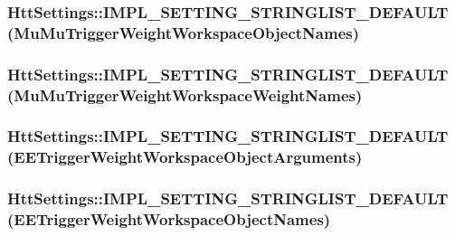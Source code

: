 \label{classHttSettings_a4ed979f31a66000c717db31d40241bae}
\hypertarget{classHttSettings_aed2ac5e09cc936ae32ab26abb998b025}{
\subsubsection[{IMPL\_\-SETTING\_\-STRINGLIST\_\-DEFAULT}]{\setlength{\rightskip}{0pt plus 5cm}HttSettings::IMPL\_\-SETTING\_\-STRINGLIST\_\-DEFAULT (MuMuTriggerWeightWorkspaceObjectNames)}}
\label{classHttSettings_aed2ac5e09cc936ae32ab26abb998b025}
\hypertarget{classHttSettings_afb45142a29386e30d75085c0fcb95607}{
\subsubsection[{IMPL\_\-SETTING\_\-STRINGLIST\_\-DEFAULT}]{\setlength{\rightskip}{0pt plus 5cm}HttSettings::IMPL\_\-SETTING\_\-STRINGLIST\_\-DEFAULT (MuMuTriggerWeightWorkspaceWeightNames)}}
\label{classHttSettings_afb45142a29386e30d75085c0fcb95607}
\hypertarget{classHttSettings_ad0011b6e8ff267281a933dd3505eba33}{
\subsubsection[{IMPL\_\-SETTING\_\-STRINGLIST\_\-DEFAULT}]{\setlength{\rightskip}{0pt plus 5cm}HttSettings::IMPL\_\-SETTING\_\-STRINGLIST\_\-DEFAULT (EETriggerWeightWorkspaceObjectArguments)}}
\label{classHttSettings_ad0011b6e8ff267281a933dd3505eba33}
\hypertarget{classHttSettings_aef75c48c8c9dfd3d5059332be5635d1d}{
\subsubsection[{IMPL\_\-SETTING\_\-STRINGLIST\_\-DEFAULT}]{\setlength{\rightskip}{0pt plus 5cm}HttSettings::IMPL\_\-SETTING\_\-STRINGLIST\_\-DEFAULT (EETriggerWeightWorkspaceObjectNames)}}
